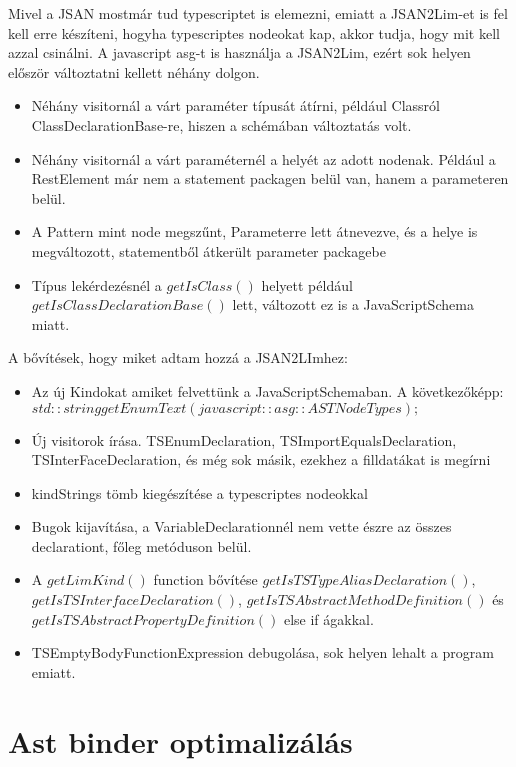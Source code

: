 Mivel a JSAN mostmár tud typescriptet is elemezni, emiatt a JSAN2Lim-et is fel kell erre készíteni, hogyha typescriptes nodeokat kap, akkor tudja, hogy mit kell azzal csinálni.
A javascript asg-t is használja a JSAN2Lim, ezért sok helyen először változtatni kellett néhány dolgon.
\begin{itemize}
      \item Néhány visitornál a várt paraméter típusát átírni, például Classról ClassDeclarationBase-re, hiszen a schémában változtatás volt.
      \item Néhány visitornál a várt paraméternél a helyét az adott nodenak. Például a RestElement már nem a statement packagen belül van, hanem a parameteren belül.
      \item A Pattern mint node megszűnt, Parameterre lett átnevezve, és a helye is megváltozott, statementből átkerült parameter packagebe
      \item Típus lekérdezésnél a $getIsClass()$ helyett például $getIsClassDeclarationBase()$ lett, változott ez is a JavaScriptSchema miatt.
\end{itemize}

A bővítések, hogy miket adtam hozzá a JSAN2LImhez:
\begin{itemize}
      \item Az új Kindokat amiket felvettünk a JavaScriptSchemaban. A következőképp: $std::string getEnumText(javascript::asg::ASTNodeTypes);$
      \item Új visitorok írása. TSEnumDeclaration, TSImportEqualsDeclaration, TSInterFaceDeclaration, és még sok másik, ezekhez a filldatákat is megírni
      \item kindStrings tömb kiegészítése a typescriptes nodeokkal
      \item Bugok kijavítása, a VariableDeclarationnél nem vette észre az összes declarationt, főleg metóduson belül.
      \item A $getLimKind()$ function bővítése $getIsTSTypeAliasDeclaration()$, $getIsTSInterfaceDeclaration()$, $getIsTSAbstractMethodDefinition()$ és $getIsTSAbstractPropertyDefinition()$ else if ágakkal.
      \item TSEmptyBodyFunctionExpression debugolása, sok helyen lehalt a program emiatt.
\end{itemize}


\section{Ast binder optimalizálás}


